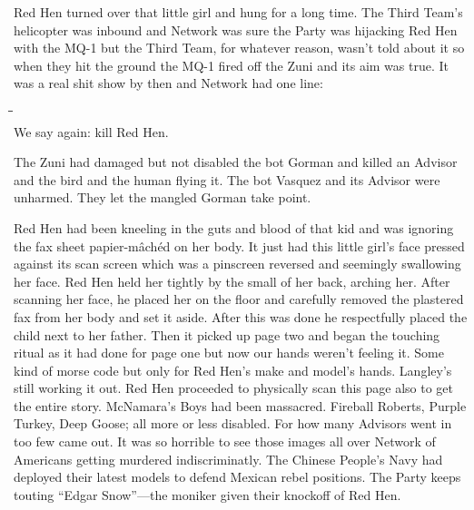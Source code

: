 \documentclass[13pt|draft]{report}
\begin{document}
Red Hen turned over that little girl and hung for a long time. The Third Team's helicopter was inbound and Network was sure the Party was hijacking Red Hen with the MQ-1 but the Third Team, for whatever reason, wasn't told about it so when they hit the ground the MQ-1 fired off the Zuni and its aim was true. It was a real shit show by then and Network had one line:

\begin{tabbing}
\= \qquad \= \qquad \= \qquad \= \\
\> \> \> \> \large We say again: kill Red Hen.
\end{tabbing}

The Zuni had damaged but not disabled the bot Gorman and killed an Advisor and the bird and the human flying it. The bot Vasquez and its Advisor were unharmed. They let the mangled Gorman take point.

Red Hen had been kneeling in the guts and blood of that kid and was ignoring the fax sheet papier-mâchéd on her body. It just had this little girl's face pressed against its scan screen which was a pinscreen reversed and seemingly swallowing her face. Red Hen held her tightly by the small of her back, arching her. After scanning her face, he placed her on the floor and carefully removed the plastered fax from her body and set it aside. After this was done he respectfully placed the child next to her father. Then it picked up page two and began the touching ritual as it had done for page one but now our hands weren't feeling it. Some kind of morse code but only for Red Hen's make and model's hands. Langley's still working it out. Red Hen proceeded to physically scan this page also to get the entire story. McNamara's Boys had been massacred. Fireball Roberts, Purple Turkey, Deep Goose; all more or less disabled. For how many Advisors went in too few came out. It was so horrible to see those images all over Network of Americans getting murdered indiscriminatly. The Chinese People's Navy had deployed their latest models to defend Mexican rebel positions. The Party keeps touting ``Edgar Snow''---the moniker given their knockoff of Red Hen.
\end{document}
